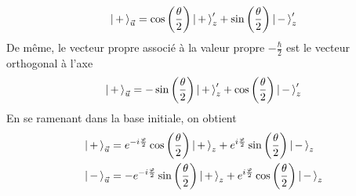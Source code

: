         \[ \left| \, + \, \right>_{\vec{u}} = \cos\left(\frac{\theta}{2}\right)\left| \, + \, \right>'_z + \sin\left(\frac{\theta}{2}\right) \left| \, - \, \right>'_z \]
        De même, le vecteur propre associé à la valeur propre $-\frac{\hbar}{2}$ est le vecteur orthogonal à l’axe
        \[ \left| \, + \, \right>_{\vec{u}} = -\sin\left(\frac{\theta}{2}\right)\left| \, + \, \right>'_z + \cos\left(\frac{\theta}{2}\right) \left| \, - \, \right>'_z \]
        En se ramenant dans la base initiale, on obtient
        \begin{align*}
            \left| \, + \, \right>_{\vec{u}} &= e^{-i \frac{\varphi}{2}}\cos\left(\frac{\theta}{2}\right)\left| \, + \, \right>_z + e^{i \frac{\varphi}{2}}\sin\left(\frac{\theta}{2}\right) \left| \, - \, \right>_z \\
            \left| \, - \, \right>_{\vec{u}} &= - e^{-i \frac{\varphi}{2}}\sin\left(\frac{\theta}{2}\right)\left| \, + \, \right>_z + e^{i \frac{\varphi}{2}}\cos\left(\frac{\theta}{2}\right) \left| \, - \, \right>_z \\
        \end{align*}


